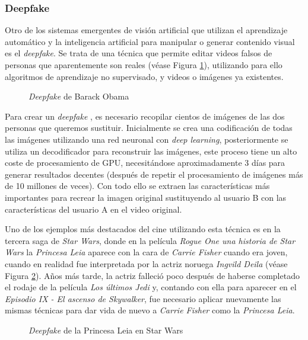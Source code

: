 \subsubsection{Deepfake}

Otro de los sistemas emergentes de visión artificial que utilizan el aprendizaje automático y la inteligencia artificial para manipular o generar contenido visual es el \textit{deepfake}. Se trata de una técnica que permite editar videos falsos de personas que aparentemente son reales (véase Figura \ref{fig:Obama}), utilizando para ello algoritmos de aprendizaje no supervisado, y videos o imágenes ya existentes. 

\begin{figure}[h!]
    \centering
    \caption{\textit{Deepfake} de Barack Obama}
    \label{fig:Obama}  
\end{figure}

Para crear un \textit{deepfake} \cite{Deepfake}, es necesario recopilar cientos de imágenes de las dos personas que queremos sustituir. Inicialmente se crea una codificación de todas las imágenes utilizando una red neuronal con \textit{deep learning}, posteriormente se utiliza un decodificador para reconstruir las imágenes, este proceso tiene un alto coste de procesamiento de GPU, necesitándose aproximadamente 3 días para generar resultados decentes (después de repetir el procesamiento de imágenes más de 10 millones de veces). Con todo ello se extraen las características más importantes para recrear la imagen original sustituyendo al usuario B con las características del usuario A en el video original.

Uno de los ejemplos más destacados del cine utilizando esta técnica es en la tercera saga de \textit{Star Wars}, donde en la película \textit{Rogue One una historia de Star Wars} la \textit{Princesa Leia} aparece con la cara de \textit{Carrie Fisher} cuando era joven, cuando en realidad fue interpretada por la actriz noruega \textit{Ingvild Deila} (véase Figura \ref{fig:Leia}). Años más tarde, la actriz falleció poco después de haberse completado el rodaje de la película \textit{Los últimos Jedi} y, contando con ella para aparecer en el \textit{Episodio IX - El ascenso de Skywalker}, fue necesario aplicar nuevamente las mismas técnicas para dar vida de nuevo a \textit{Carrie Fisher} como la \textit{Princesa Leia}.

\begin{figure}[h!]
    \centering
    \caption{\textit{Deepfake} de la Princesa Leia en Star Wars}
    \label{fig:Leia}  
\end{figure}

